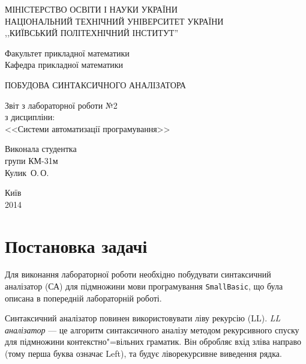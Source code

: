 \documentclass[a4paper,12pt,notitlepage,pdftex]{scrreprt}
\begin{document}
\begin{titlepage}
    \begin{center}
        \MakeUppercase{Міністерство освіти і науки України}\\
        \MakeUppercase{Національний технічний університет України}\\
        \MakeUppercase{,,Київський політехнічний інститут''}\\
        \vspace*{2em}

        Факультет прикладної математики\\
        Кафедра прикладної математики

        \vfill

        \MakeUppercase{Побудова синтаксичного аналізатора}\\
        \vspace*{1em}

        Звіт з лабораторної роботи №2\\
        з дисципліни:\\
        <<Системи автоматизації програмування>>
    \end{center}

    \vfill
    \hfill\begin{minipage}{0.4\textwidth}
        Виконала студентка\\
        групи КМ-31м\\
        Кулик~О.\,О.
    \end{minipage}

    \vfill
    \begin{center}
        Київ\\
        2014
    \end{center}
\end{titlepage}

\tableofcontents

\chapter{Постановка задачі}
\label{chap:first}
    Для виконання лабораторної роботи необхідно побудувати синтаксичний аналізатор (СА) для підмножини мови
    програмування \texttt{SmallBasic}, що була описана в попередній лабораторній роботі.

    Синтаксичний аналізатор повинен використовувати ліву рекурсію (LL).
    \textit{LL аналізатор} --- це алгоритм синтаксичного аналізу методом рекурсивного спуску для підмножини
    контекстно"=вільних граматик.
    Він обробляє вхід зліва направо (тому перша буква означає Left), та будує ліворекурсивне виведення рядка.
\end{document}
